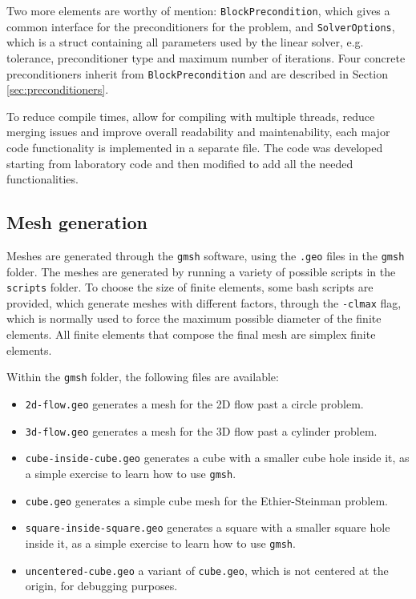 Two more elements are worthy of mention: \texttt{BlockPrecondition}, which gives a common interface for the preconditioners for the problem, and \texttt{SolverOptions}, which is a struct containing all parameters used by the linear solver, e.g. tolerance, preconditioner type and maximum number of iterations. Four concrete preconditioners inherit from \texttt{BlockPrecondition} and are described in Section \ref{sec:preconditioners}.

To reduce compile times, allow for compiling with multiple threads, reduce merging issues and improve overall readability and maintenability, each major code functionality is implemented in a separate file. The code was developed starting from laboratory code and then modified to add all the needed functionalities.

\subsection{Mesh generation}
Meshes are generated through the \texttt{gmsh} software, using the \texttt{.geo} files in the \texttt{gmsh} folder. The meshes are generated by running a variety of possible scripts in the \texttt{scripts} folder. To choose the size of finite elements, some bash scripts are provided, which generate meshes with different factors, through the \texttt{-clmax} flag, which is normally used to force the maximum possible diameter of the finite elements. All finite elements that compose the final mesh are simplex finite elements.

Within the \texttt{gmsh} folder, the following files are available:
\begin{itemize}
    \item \texttt{2d-flow.geo} generates a mesh for the 2D flow past a circle problem.
    \item \texttt{3d-flow.geo} generates a mesh for the 3D flow past a cylinder problem.
    \item \texttt{cube-inside-cube.geo} generates a cube with a smaller cube hole inside it, as a simple exercise to learn how to use \texttt{gmsh}.
    \item \texttt{cube.geo} generates a simple cube mesh for the Ethier-Steinman problem.
    \item \texttt{square-inside-square.geo} generates a square with a smaller square hole inside it, as a simple exercise to learn how to use \texttt{gmsh}.
    \item \texttt{uncentered-cube.geo} a variant of \texttt{cube.geo}, which is not centered at the origin, for debugging purposes.
\end{itemize}